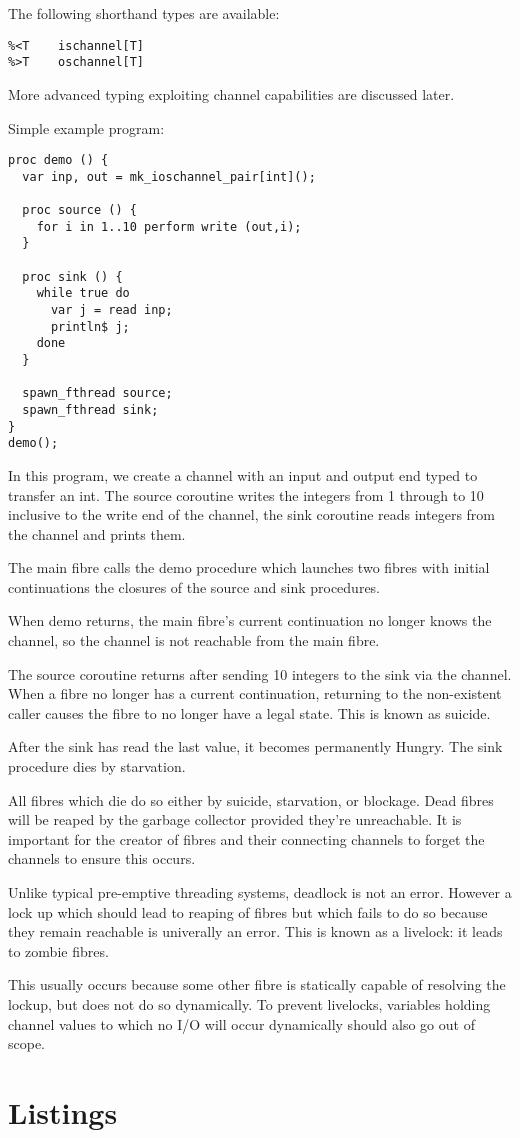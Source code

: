 \documentclass[oneside]{book}
\begin{document}
The following shorthand types are available:

\begin{verbatim}
%<T    ischannel[T]
%>T    oschannel[T]
\end{verbatim}

More advanced typing exploiting channel capabilities are
discussed later.

Simple example program:

\begin{verbatim}
proc demo () {
  var inp, out = mk_ioschannel_pair[int]();

  proc source () {
    for i in 1..10 perform write (out,i);
  }

  proc sink () {
    while true do
      var j = read inp;
      println$ j;
    done
  }

  spawn_fthread source;
  spawn_fthread sink;
}
demo();
\end{verbatim}

In this program, we create a channel with an input and
output end typed to transfer an int. The source coroutine
writes the integers from 1 through to 10 inclusive to
the write end of the channel, the sink coroutine
reads integers from the channel and prints them.

The main fibre calls the demo procedure which launches
two fibres with initial continuations the closures of
the source and sink procedures.

When demo returns, the main fibre's current continuation
no longer knows the channel, so the channel is not reachable
from the main fibre. 

The source coroutine returns after sending 10 integers to
the sink via the channel.  When a fibre no longer has
a current continuation, returning to the non-existent
caller causes the fibre to no longer have a legal
state. This is known as suicide.

After the sink has read the 
last value, it becomes permanently Hungry. The sink 
procedure dies by starvation.

All fibres which die do so either by suicide, starvation,
or blockage. Dead fibres will be reaped by the garbage
collector provided they're unreachable. It is important
for the creator of fibres and their connecting channels
to forget the channels to ensure this occurs.

Unlike typical pre-emptive threading systems, deadlock
is not an error. However a lock up which should lead to
reaping of fibres but which fails to do so because
they remain reachable is univerally an error. This is
known as a livelock: it leads to zombie fibres.

This usually occurs because some other fibre is statically
capable of resolving the lockup, but does not do so 
dynamically. To prevent livelocks, variables holding
channel values to which no I/O will occur dynamically
should also go out of scope.

\chapter{Listings}
\listoflistings 
\end{document}
